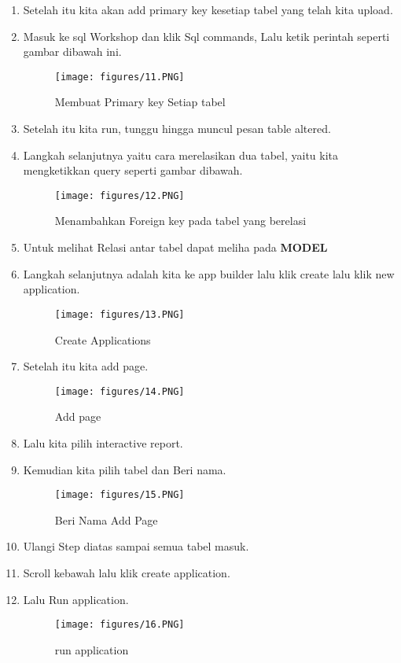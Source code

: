 \begin{enumerate}
\item Setelah itu kita akan add primary key kesetiap tabel yang telah kita upload.
\item Masuk ke sql Workshop dan klik Sql commands, Lalu ketik perintah seperti gambar dibawah ini.
\begin{figure}[!htbp]
\centering
\texttt{[image: figures/11.PNG]}
\caption{Membuat Primary key Setiap tabel}
\label{penanda}
\end{figure}
\item Setelah itu kita run, tunggu hingga muncul pesan table altered.
\item Langkah selanjutnya yaitu cara merelasikan dua tabel, yaitu kita mengketikkan query seperti gambar dibawah.
\begin{figure}[!htbp]
\centering
\texttt{[image: figures/12.PNG]}
\caption{Menambahkan Foreign key pada tabel yang berelasi}
\label{penanda}
\end{figure}
\item Untuk melihat Relasi antar tabel dapat meliha pada \textbf{MODEL}
\item Langkah selanjutnya adalah kita ke app builder lalu klik create lalu klik new application.
\begin{figure}[!htbp]
\centering
\texttt{[image: figures/13.PNG]}
\caption{Create Applications}
\label{penanda}
\end{figure}
\item  Setelah itu kita add page.
\begin{figure}[!htbp]
\centering
\texttt{[image: figures/14.PNG]}
\caption{Add page}
\label{penanda}
\end{figure}
\item Lalu kita pilih interactive report.
\item Kemudian kita pilih tabel dan Beri nama.
\begin{figure}[!htbp]
\centering
\texttt{[image: figures/15.PNG]}
\caption{Beri Nama Add Page}
\label{penanda}
\end{figure}
\item Ulangi Step diatas sampai semua tabel masuk.
\item  Scroll kebawah lalu klik create application.
\item Lalu Run application.
\begin{figure}[!htbp]
\centering
\texttt{[image: figures/16.PNG]}
\caption{run application}
\label{penanda}
\end{figure}

\end{enumerate}
